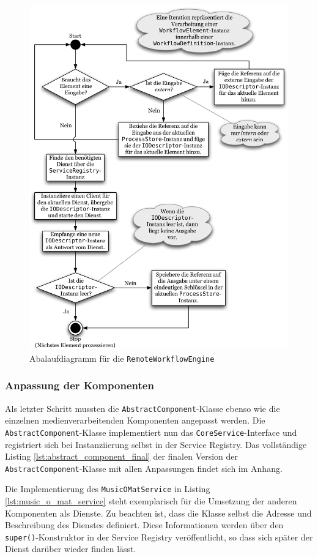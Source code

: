   \begin{figure}[!ht]
    \centering
      \includegraphics[width=.7\textwidth]{images/WorkflowEngine_Flowchart.pdf}
    \caption{Abalaufdiagramm für die \texttt{RemoteWorkflowEngine}}
    \label{fig:images_WorkflowEngine_Flowchart}
  \end{figure}


\subsubsection{Anpassung der Komponenten} %
\label{ssub:anpassung_der_komponenten}

  Als letzter Schritt mussten die \verb!AbstractComponent!-Klasse ebenso wie die einzelnen medienverarbeitenden Komponenten angepasst werden. Die \verb!AbstractComponent!-Klasse implementiert nun das \verb!CoreService!-Interface und registriert sich bei Instanziierung selbst in der Service Registry. Das vollständige Listing \ref{lst:abstract_component_final} der finalen Version der \verb!AbstractComponent!-Klasse mit allen Anpassungen findet sich im Anhang.
  
  Die Implementierung des \verb!MusicOMatService! in Listing \ref{lst:music_o_mat_service} steht exemplarisch für die Umsetzung der anderen Komponenten als Dienste. Zu beachten ist, dass die Klasse selbst die Adresse und Beschreibung des Dienstes definiert. Diese Informationen werden über den \verb!super()!-Konstruktor in der Service Registry veröffentlicht, so dass sich später der Dienst darüber wieder finden lässt.


